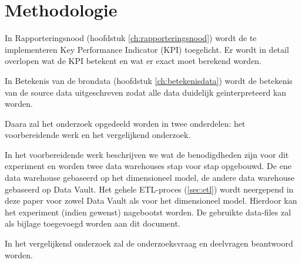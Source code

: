 
\chapter{Methodologie}
\label{ch:methodologie}

In Rapporteringsnood (hoofdstuk \ref{ch:rapporteringsnood}) wordt de te implementeren Key Performance Indicator (KPI) toegelicht. Er wordt in detail overlopen wat de KPI betekent en wat er exact moet berekend worden.

In Betekenis van de brondata (hoofdstuk \ref{ch:betekenisdata}) wordt de betekenis van de source data uitgeschreven zodat alle data duidelijk geïnterpreteerd kan worden.

Daara zal het onderzoek opgedeeld worden in twee onderdelen: het voorbereidende werk en het vergelijkend onderzoek. 

In het voorbereidende werk beschrijven we wat de benodigdheden zijn voor dit experiment en worden twee data warehouses stap voor stap opgebouwd. De ene data warehouse gebaseerd op het dimensioneel model, de andere data warehouse gebaseerd op Data Vault. Het gehele ETL-proces (\ref{sec:etl}) wordt neergepend in deze paper voor zowel Data Vault als voor het dimensioneel model. Hierdoor kan het experiment (indien gewenst) nagebootst worden. De gebruikte data-files zal als bijlage toegevoegd worden aan dit document.

In het vergelijkend onderzoek zal de onderzoeksvraag en deelvragen beantwoord worden. 